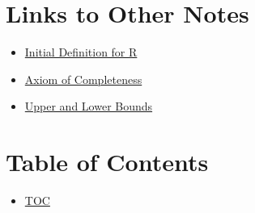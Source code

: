 \section*{Links to Other Notes}
\begin{itemize}
  \item \hyperref[202501180703]{Initial Definition for R}
  \item \hyperref[202501180727]{Axiom of Completeness}
  \item \hyperref[202501180734]{Upper and Lower Bounds}
\end{itemize}

\section*{Table of Contents}

\begin{itemize}
  \item \hyperref[toc]{TOC}
\end{itemize}


